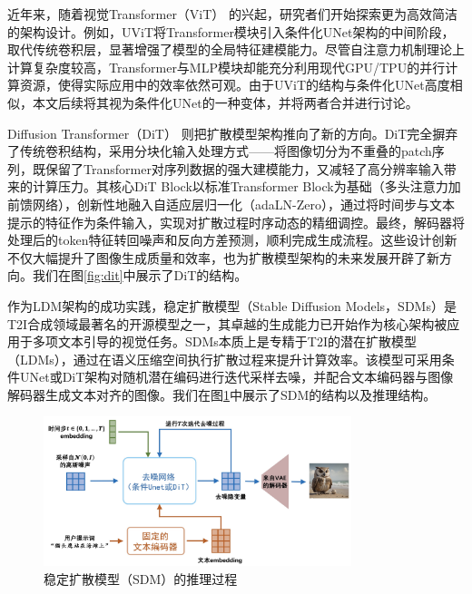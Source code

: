 \documentclass[11pt,a4paper,UTF8]{ctexart}
\begin{document}
近年来，随着视觉Transformer（ViT）\cite{dosovitskiy2020image} 的兴起，研究者们开始探索更为高效简洁的架构设计。例如，UViT\cite{uvit}将Transformer模块引入条件化UNet架构的中间阶段，取代传统卷积层，显著增强了模型的全局特征建模能力。尽管自注意力机制理论上计算复杂度较高，Transformer与MLP模块却能充分利用现代GPU/TPU的并行计算资源，使得实际应用中的效率依然可观。由于UViT的结构与条件化UNet高度相似，本文后续将其视为条件化UNet的一种变体，并将两者合并进行讨论。

Diffusion Transformer（DiT）\cite{peebles2022scalable} 则把扩散模型架构推向了新的方向。DiT完全摒弃了传统卷积结构，采用分块化输入处理方式——将图像切分为不重叠的patch序列，既保留了Transformer对序列数据的强大建模能力，又减轻了高分辨率输入带来的计算压力。其核心DiT Block以标准Transformer Block为基础（多头注意力加前馈网络），创新性地融入自适应层归一化（adaLN-Zero），通过将时间步与文本提示的特征作为条件输入，实现对扩散过程时序动态的精细调控。最终，解码器将处理后的token特征转回噪声和反向方差预测，顺利完成生成流程。这些设计创新不仅大幅提升了图像生成质量和效率，也为扩散模型架构的未来发展开辟了新方向。我们在图\ref{fig:dit}中展示了DiT的结构。

作为LDM架构的成功实践，稳定扩散模型（Stable Diffusion Models，SDMs）\cite{rombach2022high}是T2I合成领域最著名的开源模型之一，其卓越的生成能力已开始作为核心架构被应用于多项文本引导的视觉任务\cite{blattmann2023videoldm,brooks2023instructpix2pix,wang2023score,zhang2023adding}。SDMs本质上是专精于T2I的潜在扩散模型（LDMs）\cite{rombach2022high}，通过在语义压缩空间执行扩散过程\cite{ho2022classifier,liu2021pseudo,song2020denoising}来提升计算效率。该模型可采用条件UNet或DiT架构对随机潜在编码进行迭代采样去噪，并配合文本编码器\cite{radford2021learning}与图像解码器\cite{esser2021taming,van2017neural}生成文本对齐的图像。我们在图\ref{fig:sdm}中展示了SDM的结构以及推理结构。

\begin{figure}[htbp]
\centering
\includegraphics[width=0.8\textwidth]{img/SDM.jpg}
\caption{稳定扩散模型（SDM）的推理过程}
\label{fig:sdm}
\end{figure}
\end{document}
